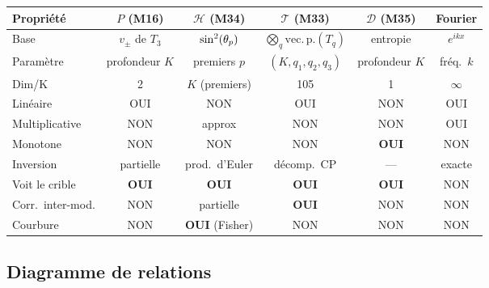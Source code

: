 \documentclass[12pt,a4paper]{article}
\begin{document}
\begin{center}
\small
\begin{tabular}{lccccc}
\toprule
\textbf{Propriété} & $P$ (M16) & $\mathcal{H}$ (M34) &
  $\mathcal{T}$ (M33) & $\mathcal{D}$ (M35) & Fourier \\
\midrule
Base & $v_\pm$ de $T_3$ & $\sin^2(\theta_{p})$ &
  $\bigotimes_q \mathrm{vec.\,p.}(T_q)$ & entropie & $e^{ikx}$ \\
Paramètre & profondeur $K$ & premiers $p$ & $(K, q_1, q_2, q_3)$ &
  profondeur $K$ & fréq.\ $k$ \\
Dim/K & 2 & $K$ (premiers) & 105 & 1 & $\infty$ \\
Linéaire & OUI & NON & OUI & NON & OUI \\
Multiplicative & NON & approx & NON & NON & OUI \\
Monotone & NON & NON & NON & \textbf{OUI} & NON \\
Inversion & partielle & prod.\ d'Euler & décomp.\ CP & --- & exacte \\
Voit le crible & \textbf{OUI} & \textbf{OUI} & \textbf{OUI} &
  \textbf{OUI} & NON \\
Corr.\ inter-mod. & NON & partielle & \textbf{OUI} & NON & NON \\
Courbure & NON & \textbf{OUI} (Fisher) & NON & NON & NON \\
\bottomrule
\end{tabular}
\end{center}


\subsection*{Diagramme de relations}
\end{document}
